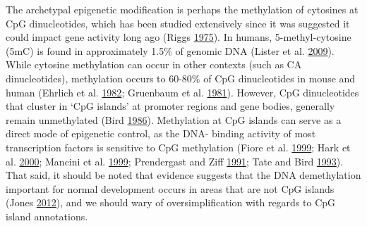 \documentclass[onehalf,12pt]{beavtex}
\begin{document}
  The archetypal epigenetic modification is perhaps the methylation of
  cytosines at CpG dinucleotides, which has been studied extensively since
  it was suggested it could impact gene activity long ago (Riggs
  \protect\hyperlink{ref-RiggsinactivationdifferentiationDNA1975}{1975}).
  In humans, 5-methyl-cytosine (5mC) is found in approximately 1.5\% of
  genomic DNA (Lister et al.
  \protect\hyperlink{ref-ListerHumanDNAmethylomes2009}{2009}). While
  cytosine methylation can occur in other contexts (such as CA
  dinucleotides), methylation occurs to 60-80\% of CpG dinucleotides in
  mouse and human (Ehrlich et al.
  \protect\hyperlink{ref-EhrlichAmountdistribution5methylcytosine1982}{1982};
  Gruenbaum et al.
  \protect\hyperlink{ref-GruenbaumMethylationCpGsequences1981}{1981}).
  However, CpG dinucleotides that cluster in `CpG islands' at promoter
  regions and gene bodies, generally remain unmethylated (Bird
  \protect\hyperlink{ref-BirdCpGrichislandsfunction1986}{1986}).
  Methylation at CpG islands can serve as a direct mode of epigenetic
  control, as the DNA- binding activity of most transcription factors is
  sensitive to CpG methylation (Fiore et al.
  \protect\hyperlink{ref-FioreCytosinemethylationtransforms1999}{1999};
  Hark et al.
  \protect\hyperlink{ref-HarkCTCFmediatesmethylationsensitive2000}{2000};
  Mancini et al.
  \protect\hyperlink{ref-ManciniSitespecificDNAmethylation1999}{1999};
  Prendergast and Ziff
  \protect\hyperlink{ref-PrendergastMethylationsensitivesequencespecificDNA1991}{1991};
  Tate and Bird
  \protect\hyperlink{ref-TateEffectsDNAmethylation1993}{1993}). That said,
  it should be noted that evidence suggests that the DNA demethylation
  important for normal development occurs in areas that are not CpG
  islands (Jones
  \protect\hyperlink{ref-JonesFunctionsDNAmethylation2012}{2012}), and we
  should wary of oversimplification with regards to CpG island
  annotations.
  
\end{document}
